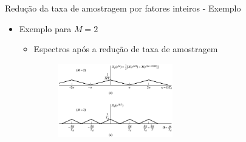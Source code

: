\documentclass[
size=11pt,
paper=screen,
mode=present,
display=slidesnotes,
style=paintings,
nopagebreaks,
blackslide,
fleqn]{powerdot}
\begin{document}
\begin{slide}{Redução da taxa de amostragem por fatores inteiros - Exemplo}
	\begin{itemize}
		\item Exemplo para $M=2$
			\begin{itemize}
		\item Espectros após a redução de taxa de amostragem 
			\begin{figure}
				\centering
				\includegraphics[width=0.5\textwidth]{figs/4-20de.eps}
		        \end{figure}
			\end{itemize}
	\end{itemize}
\end{slide} 
\end{document}
